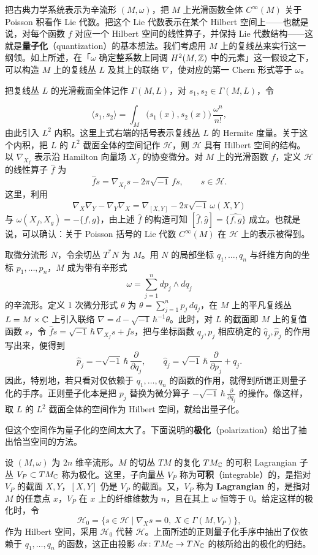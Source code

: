 把古典力学系统表示为辛流形 $(M,\omega)$，把 $M$ 上光滑函数全体 $C^{\infty}(M)$ 关于 Poisson 积看作 Lie 代数。把这个 Lie 代数表示在某个 Hilbert 空间上------也就是说，对每个函数 $f$ 对应一个 Hilbert 空间的线性算子，并保持 Lie 代数结构------这就是\textbf{量子化}（quantization）的基本想法。我们考虑用 $M$ 上的复线丛来实行这一纲领。如上所述，在「$\omega$ 确定整系数上同调 $H^{2}(M,\mathbb{Z})$ 中的元素」这一假设之下，可以构造 $M$ 上的复线丛 $L$ 及其上的联络 $\nabla$，使对应的第一 Chern 形式等于 $\omega$。

把复线丛 $L$ 的光滑截面全体记作 $\Gamma(M,L)$，对 $s_1,s_2\in\Gamma(M,L)$，令

\[
  \langle s_1,s_2\rangle=\int_M \bigl(s_1(x),s_2(x)\bigr)\,\frac{\omega^{n}}{n!},
\]
由此引入 $L^{2}$ 内积。这里上式右端的括号表示复线丛 $L$ 的 Hermite 度量。关于这个内积，把 $L$ 的 $L^{2}$ 截面全体的空间记作 $\mathcal{H}$，则 $\mathcal{H}$ 具有 Hilbert 空间的结构。以 $\nabla_{X_f}$ 表示沿 Hamilton 向量场 $X_f$ 的协变微分。对 $M$ 上的光滑函数 $f$，定义 $\mathcal{H}$ 的线性算子 $\hat f$ 为
\[
  \hat f s=\nabla_{X_f}s-2\pi\sqrt{-1}\,f s,\qquad s\in\mathcal{H}.
\]
这里，利用
\[
  \nabla_X\nabla_Y-\nabla_Y\nabla_X=\nabla_{[X,Y]}-2\pi\sqrt{-1}\,\omega(X,Y)
\]
与 $\omega(X_f,X_g)=-\{f,g\}$，由上述 $\hat f$ 的构造可知 $[\hat f,\hat g]=\widehat{\{f,g\}}$ 成立。也就是说，可以确认：关于 Poisson 括号的 Lie 代数 $C^{\infty}(M)$ 在 $\mathcal{H}$ 上的表示被得到。

取微分流形 $N$，令余切丛 $T^{*}N$ 为 $M$。用 $N$ 的局部坐标 $q_1,\dots,q_n$ 与纤维方向的坐标 $p_1,\dots,p_n$，$M$ 成为带有辛形式
\[
  \omega=\sum_{j=1}^{n} dp_j\wedge dq_j
\]
的辛流形。定义 1 次微分形式 $\theta$ 为 $\theta=\sum_{j=1}^{n}p_j\,dq_j$，在 $M$ 上的平凡复线丛 $L=M\times\mathbb{C}$ 上引入联络 $\nabla=d-\sqrt{-1}\,\hbar^{-1}\theta$。此时，对 $L$ 的截面即 $M$ 上的复值函数 $s$，令 $\hat f s=\sqrt{-1}\,\hbar\,\nabla_{X_f}s+fs$，把与坐标函数 $q_j,p_j$ 相应确定的 $\hat q_j,\hat p_j$ 的作用写出来，便得到
\[
  \hat p_j=-\sqrt{-1}\,\hbar\,\frac{\partial}{\partial q_j},\qquad
  \hat q_j=\sqrt{-1}\,\hbar\,\frac{\partial}{\partial p_j}+q_j .
\]
因此，特别地，若只看对仅依赖于 $q_1,\dots,q_n$ 的函数的作用，就得到所谓正则量子化的手序。正则量子化本是把 $p_j$ 替换为微分算子 $-\sqrt{-1}\,\hbar\,\frac{\partial}{\partial q_j}$ 的操作。像这样，取 $L$ 的 $L^{2}$ 截面全体的空间作为 Hilbert 空间，就给出量子化。

但这个空间作为量子化的空间太大了。下面说明的\textbf{极化}（polarization）给出了抽出恰当空间的方法。

设 $(M,\omega)$ 为 $2n$ 维辛流形。$M$ 的切丛 $TM$ 的复化 $TM_{\mathbb{C}}$ 的可积 Lagrangian 子丛 $V_P\subset TM_{\mathbb{C}}$ 称为极化。这里，子向量丛 $V_P$ 称为\textbf{可积}（integrable）的，是指对 $V_P$ 的截面 $X,Y$，$[X,Y]$ 仍是 $V_P$ 的截面。又，$V_P$ 称为 \textbf{Lagrangian} 的，是指对 $M$ 的任意点 $x$，$V_P$ 在 $x$ 上的纤维维数为 $n$，且在其上 $\omega$ 恒等于 $0$。给定这样的极化时，令
\[
  \mathcal{H}_0=\{s\in\mathcal{H}\mid \nabla_X s=0,\ X\in\Gamma(M,V_P)\},
\]
作为 Hilbert 空间，采用 $\mathcal{H}_0$ 代替 $\mathcal{H}$。上面所述的正则量子化手序中抽出了仅依赖于 $q_1,\dots,q_n$ 的函数，这正由投影 $d\pi\colon TM_{\mathbb{C}}\to TN_{\mathbb{C}}$ 的核所给出的极化的归结。

